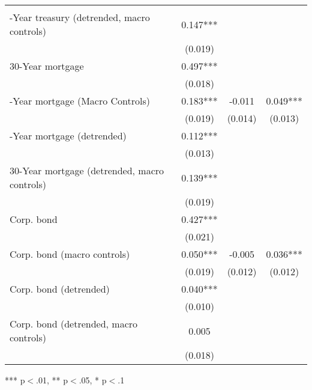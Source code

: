 \begin{table}[!h]
\begin{tabular}{llll}
  \multicolumn{1}{c}{} &
  \multicolumn{1}{c}{} \\
\multicolumn{1}{l}{\quad 10-Year treasury (detrended, macro controls)} &
  \multicolumn{1}{|c}{0.147***} &
  \multicolumn{1}{c}{} &
  \multicolumn{1}{c}{} \\
\multicolumn{1}{l}{} &
  \multicolumn{1}{|c}{(0.019)} &
  \multicolumn{1}{c}{} &
  \multicolumn{1}{c}{} \\
\multicolumn{1}{l}{30-Year mortgage} &
  \multicolumn{1}{|c}{0.497***} &
  \multicolumn{1}{c}{} &
  \multicolumn{1}{c}{} \\
\multicolumn{1}{l}{} &
  \multicolumn{1}{|c}{(0.018)} &
  \multicolumn{1}{c}{} &
  \multicolumn{1}{c}{} \\
\multicolumn{1}{l}{\quad 30-Year mortgage (Macro Controls)} &
  \multicolumn{1}{|c}{0.183***} &
  \multicolumn{1}{c}{-0.011} &
  \multicolumn{1}{c}{0.049***} \\
\multicolumn{1}{l}{} &
  \multicolumn{1}{|c}{(0.019)} &
  \multicolumn{1}{c}{(0.014)} &
  \multicolumn{1}{c}{(0.013)} \\
\multicolumn{1}{l}{\quad 30-Year mortgage (detrended)} &
  \multicolumn{1}{|c}{0.112***} &
  \multicolumn{1}{c}{} &
  \multicolumn{1}{c}{} \\
\multicolumn{1}{l}{} &
  \multicolumn{1}{|c}{(0.013)} &
  \multicolumn{1}{c}{} &
  \multicolumn{1}{c}{} \\
\multicolumn{1}{l}{30-Year mortgage (detrended, macro controls)} &
  \multicolumn{1}{|c}{0.139***} &
  \multicolumn{1}{c}{} &
  \multicolumn{1}{c}{} \\
\multicolumn{1}{l}{} &
  \multicolumn{1}{|c}{(0.019)} &
  \multicolumn{1}{c}{} &
  \multicolumn{1}{c}{} \\
\multicolumn{1}{l}{Corp. bond} &
  \multicolumn{1}{|c}{0.427***} &
  \multicolumn{1}{c}{} &
  \multicolumn{1}{c}{} \\
\multicolumn{1}{l}{} &
  \multicolumn{1}{|c}{(0.021)} &
  \multicolumn{1}{c}{} &
  \multicolumn{1}{c}{} \\
\multicolumn{1}{l}{\quad Corp. bond (macro controls)} &
  \multicolumn{1}{|c}{0.050***} &
  \multicolumn{1}{c}{-0.005} &
  \multicolumn{1}{c}{0.036***} \\
\multicolumn{1}{l}{} &
  \multicolumn{1}{|c}{(0.019)} &
  \multicolumn{1}{c}{(0.012)} &
  \multicolumn{1}{c}{(0.012)} \\
\multicolumn{1}{l}{Corp. bond (detrended)} &
  \multicolumn{1}{|c}{0.040***} &
  \multicolumn{1}{c}{} &
  \multicolumn{1}{c}{} \\
\multicolumn{1}{l}{} &
  \multicolumn{1}{|c}{(0.010)} &
  \multicolumn{1}{c}{} &
  \multicolumn{1}{c}{} \\
\multicolumn{1}{l}{\quad Corp. bond (detrended, macro controls)} &
  \multicolumn{1}{|c}{0.005} &
  \multicolumn{1}{c}{} &
  \multicolumn{1}{c}{} \\
\multicolumn{1}{l}{} &
  \multicolumn{1}{|c}{(0.018)} &
  \multicolumn{1}{c}{} &
  \multicolumn{1}{c}{} \\
\cline{1-4}
\end{tabular}

\footnotesize{
*** p$<$.01, ** p$<$.05, * p$<$.1
}
\end{table}

